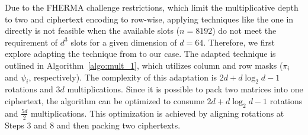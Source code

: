 \documentclass[journal=tosc,final]{iacrtrans}
\begin{document}
Due to the FHERMA challenge restrictions, which limit the multiplicative depth to two and ciphertext encoding to row-wise, applying techniques like the one in \cite{mult2_d2} directly is not feasible when the available slots ($n=8192$) do not meet the requirement of $d^3$ slots for a given dimension of $d=64$. Therefore, we first explore adapting the technique from \cite{mult2_d2} to our case. The adapted technique is outlined in Algorithm~\ref{algo:mult_1}, which utilizes column and row masks ($\pi_i$ and $\psi_i$, respectively). The complexity of this adaptation is $2d+d\log_2{d}-1$ rotations and $3d$ multiplications. Since it is possible to pack two matrices into one ciphertext, the algorithm can be optimized to consume $2d+d\log_2{d}-1$ rotations and $\frac{5d}{2}$ multiplications. This optimization is achieved by aligning rotations at Steps 3 and 8 and then packing two ciphertexts.
\end{document}
